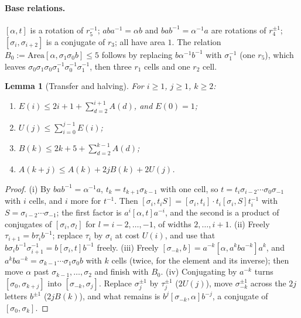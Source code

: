 \documentclass[11pt,a4paper]{article}
\theoremstyle{plain}
\newtheorem{lemma}[theorem]{Lemma}
\theoremstyle{definition}
\theoremstyle{remark}
\begin{document}
\paragraph{Base relations.} $[\alpha,t]$ is a rotation of $r_5^{-1}$; $aba^{-1}=\alpha b$ and $bab^{-1}=\alpha^{-1}a$ are
rotations of $r_4^{\pm1}$; $[\sigma_i,\sigma_{i+2}]$ is a conjugate of $r_3$; all have area $1$. The relation
$B_0:=\mathrm{Area}[\alpha,\sigma_1\sigma_0b]\le5$ follows by replacing $b\alpha^{-1}b^{-1}$ with $\sigma_1^{-1}$ (one $r_5$), which
leaves $\sigma_0\sigma_1\sigma_0\sigma_1^{-1}\sigma_0^{-1}\sigma_1^{-1}$, then three $r_1$ cells and one $r_2$ cell.

\begin{lemma}[Transfer and halving]\label{lem:transfer}
For $i\ge1$, $j\ge1$, $k\ge2$:
\begin{enumerate}[label=(\roman*)]
\item $E(i)\le2i+1+\sum_{d=2}^{i+1}A(d)$, and $E(0)=1$;
\item $U(j)\le\sum_{i=0}^{j-1}E(i)$;
\item $B(k)\le2k+5+\sum_{d=2}^{k-1}A(d)$;
\item $A(k+j)\le A(k)+2jB(k)+2U(j)$.
\end{enumerate}
\end{lemma}

\begin{proof}
(i) By $bab^{-1}=\alpha^{-1}a$, $t_k=t_{k+1}\sigma_{k-1}$ with one cell, so $t=t_i\sigma_{i-2}\cdots\sigma_0\sigma_{-1}$ with $i$ cells, and
$i$ more for $t^{-1}$. Then $[\sigma_i,t_iS]=[\sigma_i,t_i]\cdot t_i[\sigma_i,S]t_i^{-1}$ with $S=\sigma_{i-2}\cdots\sigma_{-1}$; the first
factor is $a^i[\alpha,t]a^{-i}$, and the second is a product of conjugates of $[\sigma_i,\sigma_l]$ for $l=i-2,\dots,-1$, of widths
$2,\dots,i+1$. (ii) Freely $\tau_{i+1}=b\tau_ib^{-1}$; replace $\tau_i$ by $\sigma_i$ at cost $U(i)$, and use that
$b\sigma_ib^{-1}\sigma_{i+1}^{-1}=b[\sigma_i,t]b^{-1}$ freely. (iii) Freely $[\sigma_{-k},b]=a^{-k}[\alpha,a^kba^{-k}]a^k$, and
$a^kba^{-k}=\sigma_{k-1}\cdots\sigma_1\sigma_0b$ with $k$ cells (twice, for the element and its inverse); then move $\alpha$ past
$\sigma_{k-1},\dots,\sigma_2$ and finish with $B_0$. (iv) Conjugating by $a^{-k}$ turns $[\sigma_0,\sigma_{k+j}]$ into
$[\sigma_{-k},\sigma_j]$. Replace $\sigma_j^{\pm1}$ by $\tau_j^{\pm1}$ ($2U(j)$), move $\sigma_{-k}^{\pm1}$ across the $2j$ letters $b^{\pm1}$
($2jB(k)$), and what remains is $b^j[\sigma_{-k},\alpha]b^{-j}$, a conjugate of $[\sigma_0,\sigma_k]$.
\end{proof}
\end{document}
